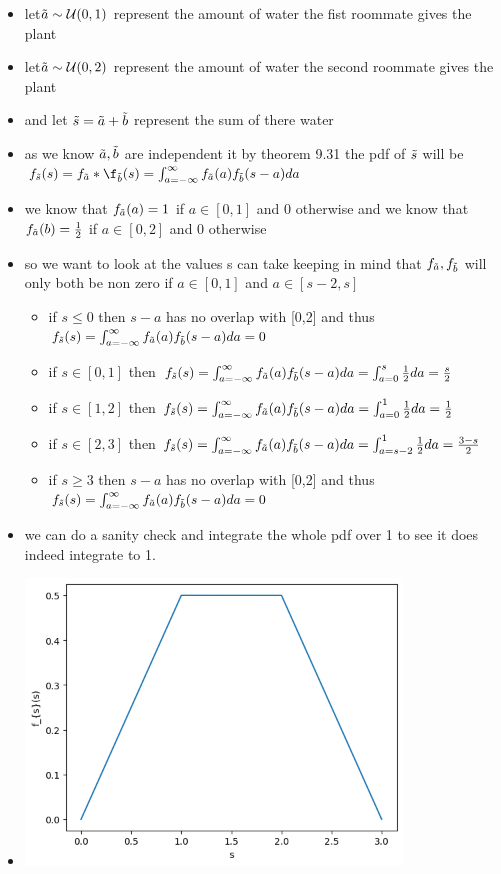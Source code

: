 \documentclass[12pt,twoside]{article}
\begin{document}
\begin{enumerate}
\begin{itemize}
\color{blue}
\item let$\Tilde{a}\sim \mathcal{U}(0,1)$ represent the amount of water the fist roommate gives the plant 
\item let$\Tilde{a}\sim \mathcal{U}(0,2)$ represent the amount of water the second roommate gives the plant 
\item and let $\Tilde{s}=\Tilde{a}+\Tilde{b}$ represent the sum of there water 
\item as we know $\Tilde{a},\Tilde{b}$ are independent it by theorem 9.31 the pdf of $\Tilde{s}$ will be $f_{\Tilde{s}}(s)=f_{\Tilde{a}}*\f_{\Tilde{b}}(s)=\int_{a=-\infty}^{\infty}f_{\Tilde{a}}(a)f_{\Tilde{b}}(s-a)da$
\item we know that $f_{\Tilde{a}}(a)=1$ if $a\in [0,1]$ and 0 otherwise and we know that $f_{\Tilde{a}}(b)=\frac{1}{2}$ if $a\in [0,2]$ and 0 otherwise
\item so we want to look at the values s can take keeping in mind that $f_{\Tilde{a}}, f_{\Tilde{b}}$ will only both be non zero if $a\in[0,1]$ and $a\in[s-2,s]$
\begin{itemize}
    \item if $s\leq 0$ then $s-a$ has no overlap with [0,2] and thus $f_{\Tilde{s}}(s)=\int_{a=-\infty}^{\infty}f_{\Tilde{a}}(a)f_{\Tilde{b}}(s-a)da=0$
    \item if $s\in[0,1]$ then 
    $f_{\Tilde{s}}(s)=\int_{a=-\infty}^{\infty}f_{\Tilde{a}}(a)f_{\Tilde{b}}(s-a)da=\int_{a=0}^{s}\frac{1}{2}da=\frac{s}{2}$
     \item if $s\in[1,2]$ then 
    $f_{\Tilde{s}}(s)=\int_{a=-\infty}^{\infty}f_{\Tilde{a}}(a)f_{\Tilde{b}}(s-a)da=\int_{a=0}^{1}\frac{1}{2}da=\frac{1}{2}$
\item if $s\in[2,3]$ then 
    $f_{\Tilde{s}}(s)=\int_{a=-\infty}^{\infty}f_{\Tilde{a}}(a)f_{\Tilde{b}}(s-a)da=\int_{a=s-2}^{1}\frac{1}{2}da=\frac{3-s}{2}$    
        \item if $s\geq 3$ then $s-a$ has no overlap with [0,2] and thus $f_{\Tilde{s}}(s)=\int_{a=-\infty}^{\infty}f_{\Tilde{a}}(a)f_{\Tilde{b}}(s-a)da=0$
\end{itemize}
\item we can do a sanity check and integrate the whole pdf over 1 to see it does indeed integrate to 1. 
\item \includegraphics[width=10cm]{homework/homework_4/immages/q_1_!.png}

\end{itemize}
\end{enumerate}
\end{document}
